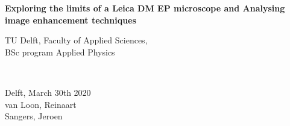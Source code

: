 \begin{titlepage}

\newcommand{\HRule}{\rule{\linewidth}{0.5mm}} %

\center


{ \huge \bfseries Exploring the limits of a Leica DM EP microscope and Analysing image enhancement techniques}\\[1cm] %






\vfill
\begin{minipage}{0.4\textwidth}
    \begin{flushleft}
        TU Delft, Faculty of Applied Sciences,\\
        BSc program Applied Physics
    \end{flushleft}
\end{minipage}
~
\begin{minipage}{0.4\textwidth}
    \begin{flushright}
        Delft, March 30th 2020\\
        van Loon, Reinaart\\
        Sangers, Jeroen
    \end{flushright}
\end{minipage}\\[1.5cm]


\end{titlepage}
